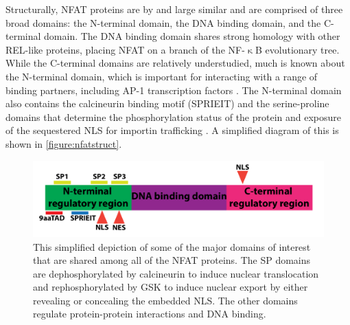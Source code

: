 Structurally, NFAT proteins are by and large similar and are comprised of three broad domains: the N-terminal domain, the DNA binding domain, and the C-terminal domain. The DNA binding domain shares strong homology with other REL-like proteins, placing NFAT on a branch of the NF-$\upkappa$B evolutionary tree. While the C-terminal domains are relatively understudied, much is known about the N-terminal domain, which is important for interacting with a range of binding partners, including AP-1 transcription factors \citep{Boise1993, Martinez2015}. The N-terminal domain also contains the calcineurin binding motif (SPRIEIT) and the serine-proline domains that determine the phosphorylation status of the protein and exposure of the sequestered NLS for importin trafficking \citep{Rao1997}. A simplified diagram of this is shown in \autoref{figure:nfatstruct}. 

\begin{figure}
\centering
\includegraphics[width=\textwidth]{images/nfatstruct.pdf}
\caption{This simplified depiction of some of the major domains of interest that are shared among all of the NFAT proteins. The SP domains are dephosphorylated by calcineurin to induce nuclear translocation and rephosphorylated by GSK to induce nuclear export by either revealing or concealing the embedded NLS. The other domains regulate protein-protein interactions and DNA binding.}
\label{figure:nfatstruct}
\end{figure}

